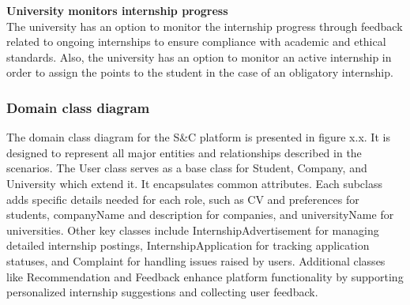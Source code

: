 \textbf{University monitors internship progress}\\
The university has an option to monitor the internship progress through feedback related to ongoing internships to ensure compliance with academic and ethical standards. Also, the university has an option to monitor an active internship in order to assign the points to the student in the case of an obligatory internship. \\




\subsubsection{Domain class diagram}

\quad The domain class diagram for the S\&C platform is presented in figure x.x. It is designed to represent all major entities and relationships described in the scenarios. The User class serves as a base class for Student, Company, and University which extend it. It encapsulates common attributes. Each subclass adds specific details needed for each role, such as CV and preferences for students, companyName and description for companies, and universityName for universities. Other key classes include InternshipAdvertisement for managing detailed internship postings, InternshipApplication for tracking application statuses, and Complaint for handling issues raised by users. Additional classes like Recommendation and Feedback enhance platform functionality by supporting personalized internship suggestions and collecting user feedback. \\

